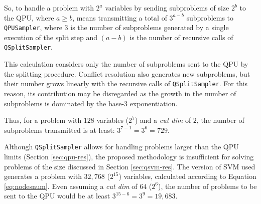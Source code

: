 So, to handle a problem with $2^a$ variables by sending subproblems of size $2^b$ to the QPU, where $a \geq b$, means transmitting a total of $3^{a-b}$ subproblems to \texttt{QPUSampler}, where 3 is the number of subproblems generated by a single execution of the split step and $(a-b)$ is the number of recursive calls of \texttt{QSplitSampler}.

This calculation considers only the number of subproblems sent to the QPU by the splitting procedure. 
Conflict resolution also generates new subproblems, but their number grows linearly with the recursive calls of \texttt{QSplitSampler}. For this reason, its contribution may be disregarded as the growth in the number of subproblems is dominated by the base-3 exponentiation.

Thus, for a problem with $128$ variables ($2^7$) and a \emph{cut dim} of $2$, the number of subproblems transmitted is at least: $3^{7-1}=3^6=729$.

Although \texttt{QSplitSampler} allows for handling problems larger than the QPU limits (Section \ref{sec:qpu-res}), the proposed methodology is insufficient for solving problems of the size discussed in Section \ref{sec:qsvm-res}. 
The version of SVM used generates a problem with $32,768$ ($2^{15}$) variables, calculated according to Equation \eqref{eq:nodesnum}. 
Even assuming a \emph{cut dim} of $64$ ($2^6$), the number of problems to be sent to the QPU would be at least $3^{15-6}=3^9=19,683$.
